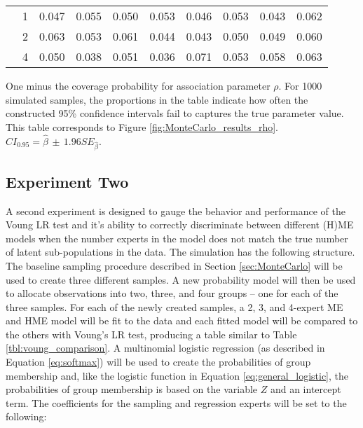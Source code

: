 \documentclass[12pt]{article}
\theoremstyle{definition}
\begin{document}
\begin{table}[b!]
\begin{threeparttable}
{\begin{tabular}[r]{l l r r r r r r r r}
          &     1 & 0.047 & 0.055 & 0.050 & 0.053 & 0.046 & 0.053 & 0.043 & 0.062 \\
          &     2 & 0.063 & 0.053 & 0.061 & 0.044 & 0.043 & 0.050 & 0.049 & 0.060 \\
          &     4 & 0.050 & 0.038 & 0.051 & 0.036 & 0.071 & 0.053 & 0.058 & 0.063 \\
  \hline
    \end{tabular}
    }
    \begin{tablenotes}
      \item{\footnotesize One minus the coverage probability for association  parameter $\rho$. For 1000 simulated samples, the proportions in the table indicate how often the constructed 95\% confidence intervals fail to captures the true parameter value. This table corresponds to Figure \ref{fig:MonteCarlo_results_rho}. $CI_{0.95} = \hat\beta \, \pm \, 1.96 SE_{\hat{\beta}}$.}
    \end{tablenotes} \label{tbl:coverage_ratio_rho}
  \end{threeparttable}
\end{table}


\clearpage

\subsection{Experiment Two} \label{subsec:ExperimentTwo}

A second experiment is designed to gauge the behavior and performance of the Voung LR test and it's ability to correctly discriminate between different (H)ME models when the number experts in the model does not match the true number of latent sub-populations in the data. The simulation has the following structure. The baseline sampling procedure described in Section \ref{sec:MonteCarlo} will be used to create three different samples. A new probability model will then be used to allocate observations into two, three, and four groups -- one for each of the three samples. For each of the newly created samples, a 2, 3, and 4-expert ME and HME model will be fit to the data and each fitted model will be compared to the others with Voung's LR test, producing a table similar to Table \ref{tbl:voung_comparison}. A multinomial logistic regression (as described in Equation \ref{eq:softmax}) will be used to create the probabilities of group membership and, like the logistic function in Equation \ref{eq:general_logistic}, the probabilities of group membership is based on the variable $Z$ and an intercept term. The coefficients for the sampling and regression experts will be set to the following: 
\end{document}
